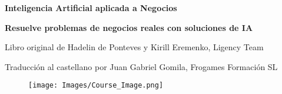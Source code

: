 
\begin{titlepage}

\begin{center}

\Huge \textbf{Inteligencia Artificial aplicada a Negocios}

\Large \textbf{Resuelve problemas de negocios reales con soluciones de IA}

\large Libro original de Hadelin de Ponteves y Kirill Eremenko, Ligency Team

\large Traducción al castellano por Juan Gabriel Gomila, Frogames Formación SL


\end{center}

\begin{figure}[!htbp]
		\begin{center}
			\texttt{[image: Images/Course\_Image.png]}
		\end{center}
\end{figure}

\end{titlepage}
